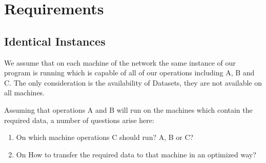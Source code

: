 \chapter{Requirements}
\label{cha:requirements}

\section{Identical Instances}
We assume that on each machine of the network the same instance of our program is running which 
is capable of all of our operations
including A, B and C. The only consideration is the availability of 
Datasets, they are not available on all machines.

Assuming that operations A and B will run on the machines which
contain the required data, a number of questions arise here:
\begin{enumerate}
\item On which machine operations C should run? A, B or C?
\item On How to transfer the required data to that machine in an 
optimized way?
\end{enumerate}